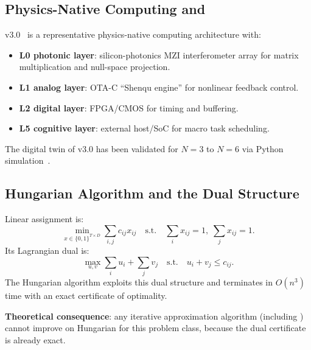 \subsection{Physics-Native Computing and \abnqss}

\abnqss v3.0~\cite{chang2026abnqss} is a representative 
physics-native computing architecture with:
\begin{itemize}[leftmargin=*]
    \item \textbf{L0 photonic layer}: silicon-photonics MZI 
          interferometer array for matrix multiplication and 
          null-space projection.
    \item \textbf{L1 analog layer}: OTA-C ``Shenqu engine'' for 
          nonlinear feedback control.
    \item \textbf{L2 digital layer}: FPGA/CMOS for timing and 
          buffering.
    \item \textbf{L5 cognitive layer}: external host/SoC for 
          macro task scheduling.
\end{itemize}
The digital twin of \abnqss v3.0 has been validated for $N=3$ to 
$N=6$ via Python simulation~\cite{chang2026n4}.

\subsection{Hungarian Algorithm and the Dual Structure}

Linear assignment is:
\begin{equation}
    \min_{x \in \{0,1\}^{T \times D}} \sum_{i,j} c_{ij} x_{ij}
    \quad \text{s.t.} \quad 
    \sum_i x_{ij} = 1,\; \sum_j x_{ij} = 1.
\end{equation}
Its Lagrangian dual is:
\begin{equation}
    \max_{u, v} \sum_i u_i + \sum_j v_j
    \quad \text{s.t.} \quad u_i + v_j \le c_{ij}.
\end{equation}
The Hungarian algorithm exploits this dual structure and terminates 
in $O(n^3)$ time with an exact certificate of optimality.

\textbf{Theoretical consequence}: any iterative approximation 
algorithm (including \ZSP) cannot improve on Hungarian for this 
problem class, because the dual certificate is already exact.